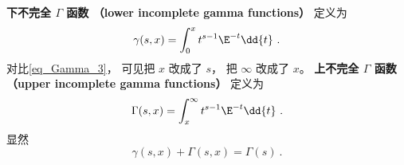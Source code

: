 
\begin{issues}
\issueDraft
\end{issues}


\textbf{下不完全 $\Gamma$ 函数 （lower incomplete gamma functions）} 定义为
\begin{equation}
\gamma(s, x) = \int_0^x t^{s-1}\E^{-t} \dd{t}~.
\end{equation}
对比\autoref{eq_Gamma_3}， 可见把 $x$ 改成了 $s$， 把 $\infty$ 改成了 $x$。
\textbf{上不完全 $\Gamma$ 函数 （upper incomplete gamma functions）} 定义为
\begin{equation}
\Gamma(s, x) = \int_x^\infty t^{s-1}\E^{-t} \dd{t}~.
\end{equation}
显然
\begin{equation}
\gamma(s, x) + \Gamma(s, x) = \Gamma(s)~.
\end{equation}
